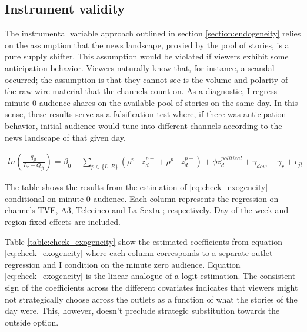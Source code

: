 \documentclass[12pt]{article}
\begin{document}
	
	
	
	
	
	
		\subsection{Instrument validity}
	
	
	The instrumental variable approach outlined in section \ref{section:endogeneity} relies on the assumption that the news landscape, proxied by the pool of stories, is a pure supply shifter. This assumption would be violated if viewers exhibit some anticipation behavior. Viewers naturally know that, for instance,  a scandal occurred; the assumption is that they cannot see is the volume and polarity of the raw wire material that the channels count on. As a diagnostic, I regress minute-0 audience shares on the available pool of stories on the same day. In this sense, these results serve as a falsification test where, if there was anticipation behavior, initial audience would tune into different channels according to the news landscape of that given day.
	
	\begin{equation}\label{eq:check_exogeneity}
		\begin{aligned}
			ln\left( \frac{q_{jt}}{L_{r}-Q_{jt}}  \right) = \beta_0 + \sum_{p \in \{L,R\}}\left(\rho^{p+} z^{p+}_d + \rho^{p-} z^{p-}_d \right)+ \phi z^{political}_d + \gamma_{dow} + \gamma_r + \epsilon_{jt}
		\end{aligned}
	\end{equation} 
	
	
	
	
	\begin{table}
		\centering
		
		\caption{The table shows the results from the estimation of \ref{eq:check_exogeneity} conditional on minute 0 audience. Each column represents the regression on channels TVE, A3, Telecinco and La Sexta ; respectively. Day of the week and region fixed effects are included. }
		\label{table:check_exogeneity}
	\end{table}
	
	
	Table \ref{table:check_exogeneity} show the estimated coefficients from equation \ref{eq:check_exogeneity} where each column corresponds to a separate outlet regression and I condition on the minute zero audience. Equation \ref{eq:check_exogeneity} is the linear analogue of a logit estimation. The consistent sign of the coefficients across the different covariates indicates that viewers might not strategically choose across the outlets as a function of what the stories of the day were. This, however, doesn't preclude strategic substitution towards the outside option. 
	
\end{document}
